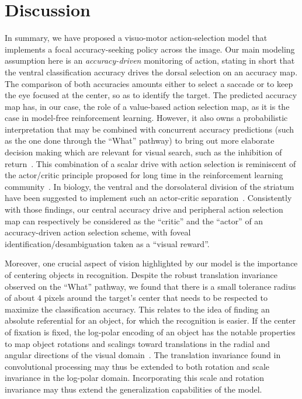 \section{Discussion} \label{sec:discussion}
In summary, we have proposed a visuo-motor action-selection model that implements a focal accuracy-seeking policy across the image. Our main modeling assumption here is an \emph{accuracy-driven} monitoring of action, stating in short that the ventral classification accuracy drives the dorsal selection on an accuracy map. The comparison of both accuracies amounts either to select a saccade or to keep the eye focused at the center, so as to identify the target. The predicted accuracy map has, in our case, the role of a value-based action selection map, as it is the case in model-free reinforcement learning. However, it also owns a probabilistic interpretation that may be combined with concurrent accuracy predictions (such as the one done through the ``What'' pathway) to bring out more elaborate decision making which are relevant for visual search, such as the inhibition of return~\cite{Itti01}. This combination of a scalar drive with action selection is reminiscent of the actor/critic principle proposed for long time in the reinforcement learning community~\cite{sutton1998reinforcement}. In biology, the ventral and the dorsolateral division of the striatum have been suggested to implement such an actor-critic separation~\cite{joel2002actor, takahashi2008silencing}. Consistently with those findings, our central accuracy drive and peripheral action selection map can respectively be considered as the ``critic'' and the ``actor'' of an accuracy-driven action selection scheme, with foveal identification/desambiguation taken as a ``visual reward''.

Moreover, one crucial aspect of vision highlighted by our model is the importance of centering objects in recognition. Despite the robust translation invariance observed on the ``What'' pathway, we found that there is a small tolerance radius of about $4$ pixels around the target's center that needs to be respected to maximize the classification accuracy. This relates to the idea of finding an absolute referential for an object, for which the recognition is easier. If the center of fixation is fixed, the log-polar encoding of an object has the notable properties to map object rotations and scalings toward translations in the radial and angular directions of the visual domain~\cite{Traver10}. The translation invariance found in convolutional processing may thus be extended to both rotation and scale invariance in the log-polar domain. Incorporating this scale and rotation invariance may thus extend the generalization capabilities of the model.

